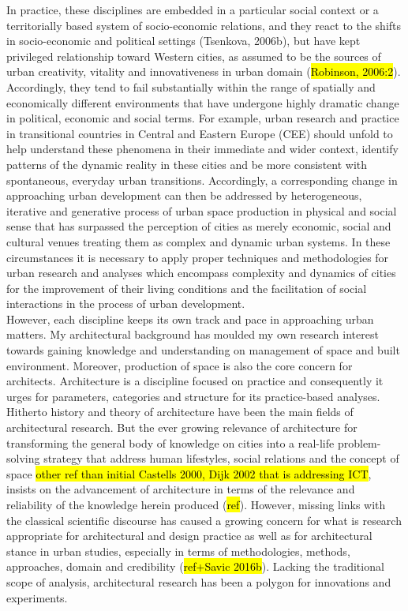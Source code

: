 \documentclass[11pt]{report}
\begin{document}
In practice, these disciplines are embedded in a particular social context or a territorially based system of socio-economic relations, and they react to the shifts in socio-economic and political settings (Tsenkova, 2006b), but have kept privileged relationship toward Western cities, as assumed to be the sources of urban creativity, vitality and innovativeness in urban domain (\hl{Robinson, 2006:2}). Accordingly, they tend to fail substantially within the range of spatially and economically different environments that have undergone highly dramatic change in political, economic and social terms. For example, urban research and practice in transitional countries in Central and Eastern Europe (CEE) should unfold to help understand these phenomena in their immediate and wider context, identify patterns of the dynamic reality in these cities and be more consistent with spontaneous, everyday urban transitions. Accordingly, a corresponding change in approaching urban development can then be addressed by heterogeneous, iterative and generative process of urban space production in physical and social sense that has surpassed the perception of cities as merely economic, social and cultural venues treating them as complex and dynamic urban systems. In these circumstances it is necessary to apply proper techniques and methodologies for urban research and analyses which encompass complexity and dynamics of cities for the improvement of their living conditions and the facilitation of social interactions in the process of urban development.
\\
However, each discipline keeps its own track and pace in approaching urban matters. My architectural background has moulded my own research interest towards gaining knowledge and understanding on management of space and built environment. Moreover, production of space is also the core concern for architects. Architecture is a discipline focused on practice and consequently it urges for parameters, categories and structure for its practice-based analyses. Hitherto history and theory of architecture have been the main fields of architectural research. But the ever growing relevance of architecture for transforming the general body of knowledge on cities into a real-life problem-solving strategy that address human lifestyles, social relations and the concept of space \hl{other ref than initial Castells 2000, Dijk 2002 that is addressing ICT}, insists on the advancement of architecture in terms of the relevance and reliability of the knowledge herein produced (\hl{ref}). However, missing links with the classical scientific discourse has caused a growing concern for what is research appropriate for architectural and design practice as well as for architectural stance in urban studies, especially in terms of methodologies, methods, approaches, domain and credibility (\hl{ref+Savic 2016b}). Lacking the traditional scope of analysis, architectural research has been a polygon for innovations and experiments.
\end{document}
